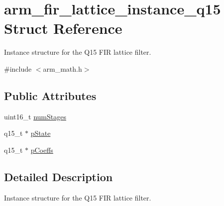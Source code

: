 \hypertarget{structarm__fir__lattice__instance__q15}{\section{arm\-\_\-fir\-\_\-lattice\-\_\-instance\-\_\-q15 Struct Reference}
\label{structarm__fir__lattice__instance__q15}
}


Instance structure for the Q15 F\-I\-R lattice filter.  




{\ttfamily \#include $<$arm\-\_\-math.\-h$>$}

\subsection*{Public Attributes}
\begin{DoxyCompactItemize}
\item 
uint16\-\_\-t \hyperlink{structarm__fir__lattice__instance__q15_a38b179138d6a6c9cac4f8f79b6fd5357}{num\-Stages}
\item 
q15\-\_\-t $\ast$ \hyperlink{structarm__fir__lattice__instance__q15_a37b90dea2bc3ee7c9951a9fe74db0cbb}{p\-State}
\item 
q15\-\_\-t $\ast$ \hyperlink{structarm__fir__lattice__instance__q15_a78f872826140069cf67836fff87360bc}{p\-Coeffs}
\end{DoxyCompactItemize}


\subsection{Detailed Description}
Instance structure for the Q15 F\-I\-R lattice filter. 

